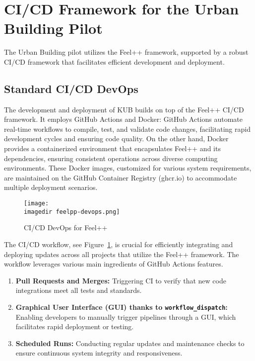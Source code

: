 \documentclass[runningheads]{llncs}
\newcommand{\imagedir}{./} %
\begin{document}


\section{CI/CD Framework for the Urban Building Pilot}
The Urban Building pilot utilizes the Feel++ framework, supported by a robust CI/CD framework that facilitates efficient development and deployment. %

\subsection{Standard CI/CD DevOps}
The development and deployment of KUB builds on top of the Feel++ CI/CD framework. It employs GitHub Actions and Docker: GitHub Actions automate real-time workflows to compile, test, and validate code changes, facilitating rapid development cycles and ensuring code quality. On the other hand, Docker provides a containerized environment that encapsulates Feel++ and its dependencies, ensuring consistent operations across diverse computing environments. These Docker images, customized for various system requirements, are maintained on the GitHub Container Registry (ghcr.io) to accommodate multiple deployment scenarios.

\begin{figure}
    \centering
    \texttt{[image: \\imagedir feelpp-devops.png]}
    \caption{CI/CD DevOps for Feel++}
    \label{fig:feelpp-devops}
\end{figure}
The CI/CD workflow, see Figure~\ref{fig:feelpp-devops}, is crucial for efficiently integrating and deploying updates across all projects that utilize the Feel++ framework. The workflow leverages various main ingredients of GitHub Actions features.
\begin{enumerate}
    \item \textbf{Pull Requests and Merges:} Triggering CI to verify that new code integrations meet all tests and standards.
    \item \textbf{Graphical User Interface (GUI) thanks to \texttt{workflow\_dispatch}:} Enabling developers to manually trigger pipelines through a GUI, which facilitates rapid deployment or testing. 
    \item \textbf{Scheduled Runs:} Conducting regular updates and maintenance checks to ensure continuous system integrity and responsiveness.
\end{enumerate}
\end{document}
